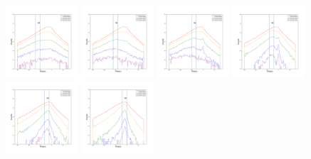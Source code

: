 \documentclass[12pt,prd]{article}
\begin{document}
\begin{figure}[h!]
\includegraphics[width=0.24\textwidth]{../figures/scanning_plotsgaiascan_l75_0_b66_4_ra216_0_dec41_0_npy_6.pdf}
\includegraphics[width=0.24\textwidth]{../figures/scanning_plotsgaiascan_l75_0_b66_4_ra216_0_dec41_0_npy_7.pdf}
\includegraphics[width=0.24\textwidth]{../figures/scanning_plotsgaiascan_l75_0_b66_4_ra216_0_dec41_0_npy_8.pdf}
\includegraphics[width=0.24\textwidth]{../figures/scanning_plotsgaiascan_l75_0_b66_4_ra216_0_dec41_0_npy_9.pdf}
\includegraphics[width=0.24\textwidth]{../figures/scanning_plotsgaiascan_l75_0_b66_4_ra216_0_dec41_0_npy_10.pdf}
\includegraphics[width=0.24\textwidth]{../figures/scanning_plotsgaiascan_l75_0_b66_4_ra216_0_dec41_0_npy_11.pdf}

\end{figure}
\end{document}
